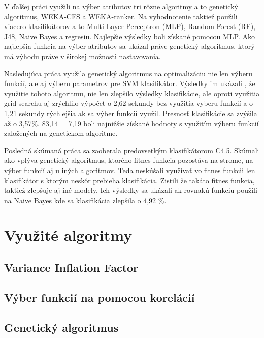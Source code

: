 \documentclass[runningheads]{llncs}
\begin{document}
V ďalšej práci\cite{ref_babatunde} využili na výber atributov tri rôzne algoritmy a to 
genetický algoritmus, WEKA-CFS a WEKA-ranker. Na vyhodnotenie taktiež použili viacero klasifikátorov
a to Multi-Layer Perceptron (MLP), Random Forest (RF), J48, Naive Bayes a regresiu. Najlepšie výsledky 
boli získané pomocou MLP. Ako najlepšia funkcia na výber atributov sa ukázal práve genetický algoritmus,
ktorý má výhodu práve v širokej možnosti nastavovania.

Nasledujúca práca\cite{ref_zhao} využila genetický algoritmus na optimalizáciu nie 
len výberu funkcií, ale aj výberu parametrov pre SVM klasifikátor. Výsledky im ukázali
, že využitie tohoto algoritmu, nie len zlepšilo výsledky klasifikácie, 
ale oproti využitia grid searchu aj zrýchlilo výpočet o 2,62 sekundy bez využitia
vyberu funkcií a o 1,21 sekundy rýchlejšia ak sa výber funkcií využil.
Presnosť klasifikácie sa zvýšila až o 3,57\%. 83,14 ± 7,19 boli najnižšie 
získané hodnoty s využitím výberu funkcií založených na genetickom algoritme.

Posledná skúmaná práca \cite{ref_smith} sa zaoberala predovsetkým klasifikátorom C4.5.
Skúmali ako vplýva genetický algoritmus, ktorého fitnes funkcia pozostáva na strome, 
na výber funkcií aj u iných algoritmov. Teda neskúšali využívať vo fitnes funkcii len
klasifikátor s ktorým neskôr prebieha klasifikácia. Zistili že takáto fitnes funkcia,
taktiež zlepšuje aj iné modely. Ich výsledky sa ukázali ak rovnakú funkciu použili na 
Naive Bayes kde sa klasifikácia zlepšila o 4,92 \%.


\section{Využité algoritmy}
\subsection{Variance Inflation Factor}
\subsection{Výber funkcií na pomocou korelácií}
\subsection{Genetický algoritmus}

\end{document}
